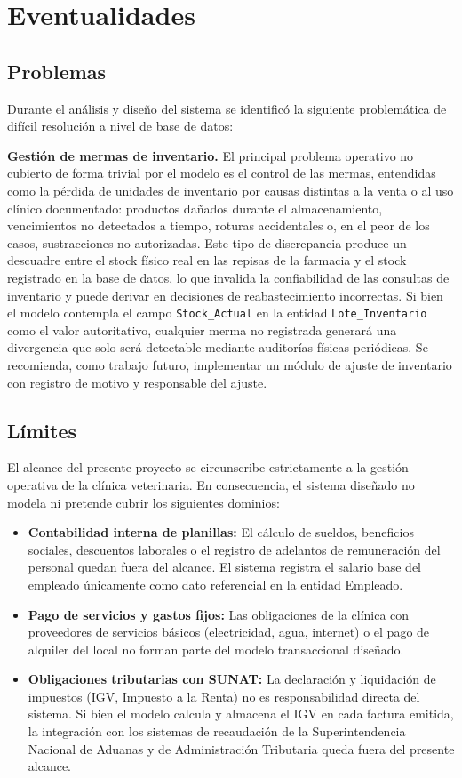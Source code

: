 \section{Eventualidades}

\subsection{Problemas}

Durante el análisis y diseño del sistema se identificó la siguiente problemática de difícil resolución a nivel de base de datos:

\textbf{Gestión de mermas de inventario.} El principal problema operativo no cubierto de forma trivial por el modelo es el control de las mermas, entendidas como la pérdida de unidades de inventario por causas distintas a la venta o al uso clínico documentado: productos dañados durante el almacenamiento, vencimientos no detectados a tiempo, roturas accidentales o, en el peor de los casos, sustracciones no autorizadas. Este tipo de discrepancia produce un descuadre entre el stock físico real en las repisas de la farmacia y el stock registrado en la base de datos, lo que invalida la confiabilidad de las consultas de inventario y puede derivar en decisiones de reabastecimiento incorrectas. Si bien el modelo contempla el campo \texttt{Stock\_Actual} en la entidad \texttt{Lote\_Inventario} como el valor autoritativo, cualquier merma no registrada generará una divergencia que solo será detectable mediante auditorías físicas periódicas. Se recomienda, como trabajo futuro, implementar un módulo de ajuste de inventario con registro de motivo y responsable del ajuste.

\subsection{Límites}

El alcance del presente proyecto se circunscribe estrictamente a la gestión operativa de la clínica veterinaria. En consecuencia, el sistema diseñado no modela ni pretende cubrir los siguientes dominios:

\begin{itemize}
	\item \textbf{Contabilidad interna de planillas:} El cálculo de sueldos, beneficios sociales, descuentos laborales o el registro de adelantos de remuneración del personal quedan fuera del alcance. El sistema registra el salario base del empleado únicamente como dato referencial en la entidad Empleado.
	\item \textbf{Pago de servicios y gastos fijos:} Las obligaciones de la clínica con proveedores de servicios básicos (electricidad, agua, internet) o el pago de alquiler del local no forman parte del modelo transaccional diseñado.
	\item \textbf{Obligaciones tributarias con SUNAT:} La declaración y liquidación de impuestos (IGV, Impuesto a la Renta) no es responsabilidad directa del sistema. Si bien el modelo calcula y almacena el IGV en cada factura emitida, la integración con los sistemas de recaudación de la Superintendencia Nacional de Aduanas y de Administración Tributaria queda fuera del presente alcance.
\end{itemize}
